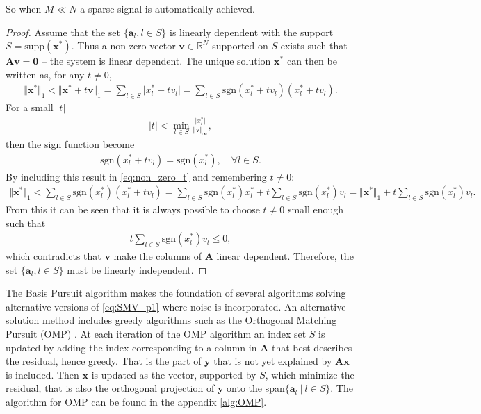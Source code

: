 So when $M \ll N$ a sparse signal is automatically achieved.
\begin{proof}
Assume that the set $\lbrace \mathbf{a}_l, l \in S \rbrace$ is linearly dependent with the support $S = \text{supp}(\mathbf{x}^\ast)$.
Thus a non-zero vector $\mathbf{v} \in \mathbb{R}^N$ supported on $S$ exists such that $\mathbf{Av} = \textbf{0}$ -- the system is linear dependent. The unique solution $\mathbf{x}^\ast$ can then be written as, for any $t \neq 0$,
\begin{align}\label{eq:non_zero_t}
\Vert \mathbf{x}^\ast \Vert_1 < \Vert \mathbf{x}^\ast + t \mathbf{v} \Vert_1 = \sum_{l \in S} \vert x_l^\ast + t v_l \vert = \sum_{l \in S} \text{sgn}(x_l^\ast + t v_l )(x_l^\ast + t v_l ).
\end{align}
For a small $|t|$
\begin{align*}
|t| < \min_{l \in S} \frac{\vert x_l^\ast \vert}{\Vert \mathbf{v} \Vert_{\infty}},
\end{align*}
then the sign function become
\begin{align*}
\text{sgn}(x_l^\ast + t v_l) = \text{sgn}(x_l^\ast), \quad \forall l \in S.
\end{align*}
By including this result in \eqref{eq:non_zero_t} and remembering $t \neq 0$:
\begin{align*}
\Vert \textbf{x}^{\ast} \Vert_1 < \sum_{l \in S} \text{sgn}(x_l^{\ast})(x_l^{\ast} + t v_l ) = \sum_{l \in S} \text{sgn}(x_l^{\ast})x_l^{\ast} + t \sum_{l \in S} \text{sgn}(x_l^{\ast})v_l = \Vert \textbf{x}^{\ast} \Vert_1 + t \sum_{l \in S} \text{sgn}(x_l^{\ast})v_l.
\end{align*}
From this it can be seen that it is always possible to choose $t \neq 0$ small enough such that 
\begin{align*}
t \sum_{l \in S} \text{sgn}(x_l^\ast)v_l \leq 0,
\end{align*}
which contradicts that $\mathbf{v}$ make the columns of $\mathbf{A}$ linear dependent. 
Therefore, the set $\lbrace \mathbf{a}_l, l \in S \rbrace$ must be linearly independent.
\end{proof}

The Basis Pursuit algorithm makes the foundation of several algorithms solving alternative versions of \eqref{eq:SMV_p1} where noise is incorporated. 
An alternative solution method includes greedy algorithms such as the Orthogonal Matching Pursuit (OMP) \cite[P. 65]{FR}. 
At each iteration of the OMP algorithm an index set $S$ is updated by adding the index corresponding to a column in $\mathbf{A}$ that best describes the residual, hence greedy.
That is the part of $\mathbf{y}$ that is not yet explained by $\mathbf{Ax}$ is included. 
Then $\mathbf{x}$ is updated as the vector, supported by $S$, which minimize the residual, that is also the orthogonal projection of $\mathbf{y}$ onto the span$\lbrace \mathbf{a}_l \ \vert \ l \in S \rbrace$. The algorithm for OMP can be found in the appendix \ref{alg:OMP}.

